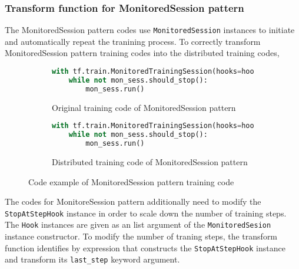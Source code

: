 \subsubsection{Transform function for MonitoredSession pattern}

The MonitoredSession pattern codes use {\tt MonitoredSession} instances
to initiate and automatically repeat the tranining process.
To correctly transform MonitoredSession pattern training codes into the
distributed training codes,

\begin{figure}[ht!]
  \begin{subfigure}[t]{0.45\textwidth}
    \begin{lstlisting}[language=Python]
with tf.train.MonitoredTrainingSession(hooks=hooks) as mon_sess:
    while not mon_sess.should_stop():
        mon_sess.run()
    \end{lstlisting}
    \caption{Original training code of MonitoredSession pattern}
  \end{subfigure}
  \hspace{5mm}
  \begin{subfigure}[t]{0.45\textwidth}
    \begin{lstlisting}[language=Python]
with tf.train.MonitoredTrainingSession(hooks=hooks.append(hvd.BroadcastGlobalVariablesHook(0)) as mon_sess:
    while not mon_sess.should_stop():
        mon_sess.run()
    \end{lstlisting}
    \caption{Distributed training code of MonitoredSession pattern}
  \end{subfigure}
  \caption{Code example of MonitoredSession pattern training code}
  \label{fig:trans:monsesstrans}
\end{figure}

The codes for MonitoreSession pattern additionally need to modify the
{\tt StopAtStepHook} instance in order to scale down the number of
training steps. The {\tt Hook} instances are given as an list argument of
the {\tt MonitoredSesion} instance constructor.
To modify the number of traning steps, the transform function
identifies by expression that constructs the {\tt StopAtStepHook} instance
and transform its {\tt last\_step} keyword argument.

